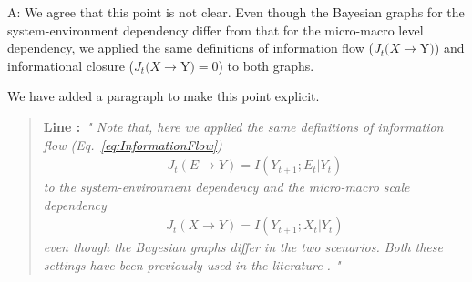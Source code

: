 \documentclass[utf8]{article}
\newenvironment{ans}  
    {\color{Black}\noindent A:}
    {~\newline}
\newcommand{\addnew}[2]{\blockcquote{}{\textbf{Line #1:}~\newline\textit{"#2"}}
}
\begin{document}
    	\begin{ans}
    		We agree that this point is not clear. Even though the Bayesian graphs for the system-environment dependency differ from that for the micro-macro level dependency, we applied the same definitions of information flow ($J_{t}(X \rightarrow $Y$ )$) and informational closure ($J_{t}(X \rightarrow $Y$ )=0$) to both graphs. 
    		
    		
    		
    		We have added a paragraph to make this point explicit. 
    		
    		\addnew{}{
    			Note that, here we applied the same definitions of information flow (Eq.~\ref{eq:InformationFlow})
    			\begin{align}
    			J_{t}(E \rightarrow Y )=I(Y_{t+1};E_t|Y_t)
    			\end{align}
    			to the system-environment dependency
    			and the micro-macro scale dependency
    			\begin{align}
    			J_{t}(X \rightarrow Y )=I(Y_{t+1};X_t|Y_t)
    			\end{align}
    			even though the Bayesian graphs differ in the two scenarios. Both these settings have been previously used in the literature \citep[see][]{BERTSCHINGER.2006, PFANTE.2014}.
    		}	
    	\end{ans}
    
\end{document}
